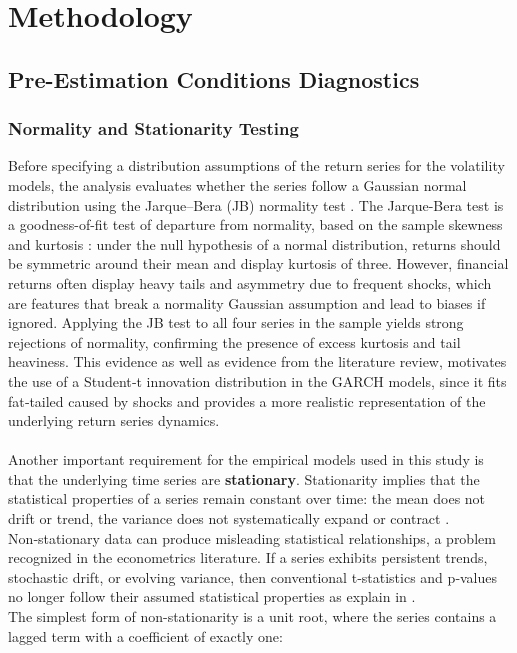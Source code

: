 \documentclass[12pt,a4paper,titlepage,oneside,english]{article}
\begin{document}

\section{Methodology}

\subsection{Pre-Estimation Conditions Diagnostics}
\subsubsection{Normality and Stationarity Testing}
Before specifying a distribution assumptions of the return series for the volatility models, the analysis evaluates whether the series follow a Gaussian normal distribution using the Jarque–Bera (JB) normality test \parencite{JARQUE1980255}. The Jarque-Bera test is a goodness-of-fit test of departure from normality, based on the sample skewness and kurtosis \parencite{Jarque2011}: under the null hypothesis of a normal distribution, returns should be symmetric around their mean and display kurtosis of three. However, financial returns often display heavy tails and asymmetry due to frequent shocks, which are features that break a normality Gaussian assumption and lead to biases if ignored. Applying the JB test to all four series in the sample yields strong rejections of normality, confirming the presence of excess kurtosis and tail heaviness. This evidence as well as evidence from the literature review, motivates the use of a Student‑t innovation distribution in the GARCH models, since it fits fat‑tailed caused by shocks and provides a more realistic representation of the underlying return series dynamics.\\
\\
Another important requirement for the empirical models used in this study is that the underlying time series are \textbf{stationary}. Stationarity implies that the statistical properties of a series remain constant over time: the mean does not drift or trend, the variance does not systematically expand or contract \parencite{Ruey2013}.
Non‑stationary data can produce misleading statistical relationships, a problem recognized in the econometrics literature. If a series exhibits persistent trends, stochastic drift, or evolving variance, then conventional t‑statistics and p‑values no longer follow their assumed statistical properties as explain in \parencite{Ruey2013}.\\
The simplest form of non-stationarity is a unit root, where the series contains a lagged term with a coefficient of exactly one:
\end{document}
